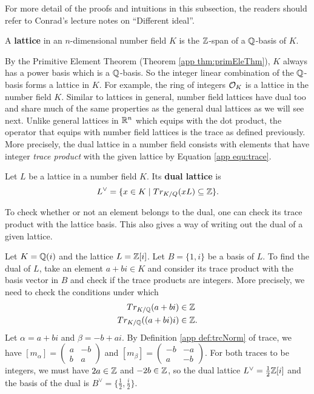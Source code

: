 \documentclass[../main.tex]{subfiles}
\begin{document}
For more detail of the proofs and intuitions in this subsection, the readers should refer to Conrad's lecture notes on ``Different ideal''.

\begin{definition}
\reversemarginpar
{}
A \textbf{lattice} in an $n$-dimensional number field $K$ is the $\mathbb{Z}$-span of a $\mathbb{Q}$-basis of $K$.  
\end{definition}
By the Primitive Element Theorem (Theorem \ref{app thm:primEleThm}), $K$ always has a power basis which is a $\mathbb{Q}$-basis. So the integer linear combination of the $\mathbb{Q}$-basis forms a lattice in $K$. For example, the ring of integers $\mathcal{O}_K$ is a lattice in the number field $K$. Similar to lattices in general, number field lattices have dual too and share much of the same properties as the general dual lattices as we will see next. Unlike general lattices in $\mathbb{R}^n$ which equips with the dot product, the operator that equips with number field lattices is the trace as defined previously. More precisely, the dual lattice in a number field consists with elements that have integer \textit{trace product} with the given lattice by Equation \ref{app equ:trace}. 

\begin{definition}
\reversemarginpar
{}
Let $L$ be a lattice in a number field $K$. Its \textbf{dual lattice} is 
\begin{equation*}
    L^{\vee} = \{x \in K \mid Tr_{K/Q}(xL) \subseteq \mathbb{Z}\}.
\end{equation*}
\end{definition}

To check whether or not an element belongs to the dual, one can check its trace product with the lattice basis. This also gives a way of writing out the dual of a given lattice. 

\begin{example}
Let $K=\mathbb{Q}(i)$ and the lattice $L=\mathbb{Z}[i]$. Let $B=\{1,i\}$ be a basis of $L$. To find the dual of $L$, take an element $a+bi \in K$ and consider its trace product with the basis vector in $B$ and check if the trace products are integers. More precisely, we need to check the conditions under which
\begin{align*}
    Tr_{K/\mathbb{Q}}(a+bi) &\in \mathbb{Z} \\
    Tr_{K/\mathbb{Q}}((a+bi)i) &\in \mathbb{Z}.
\end{align*}
Let $\alpha=a+bi$ and $\beta=-b+ai$. By Definition \ref{app def:trcNorm} of trace, we have $[m_{\alpha}] = \begin{pmatrix}
  a & -b\\ 
  b & a
\end{pmatrix}$ and 
$[m_{\beta}] = \begin{pmatrix}
  -b & -a\\ 
  a & -b
\end{pmatrix}$. For both traces to be integers, we must have $2a \in \mathbb{Z}$ and $-2b \in \mathbb{Z}$, so the dual lattice $L^{\vee}=\frac{1}{2}\mathbb{Z}[i]$ and the basis of the dual is $B^{\vee}=\{\frac{1}{2},\frac{i}{2}\}$.
\end{example}
\end{document}
